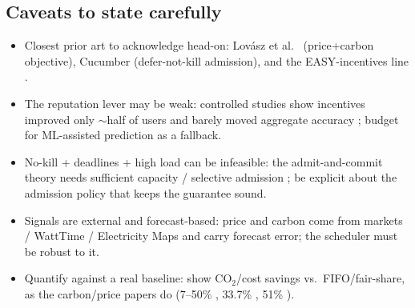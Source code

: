 \documentclass{article}
\begin{document}
\subsection*{Caveats to state carefully}
\begin{itemize}
\item Closest prior art to acknowledge head-on: Lov\'asz et al.\ \cite{r23}
(price+carbon objective), Cucumber \cite{r39} (defer-not-kill admission), and the
EASY-incentives line \cite{r34}.
\item The reputation lever may be weak: controlled studies show incentives improved
only $\sim$half of users and barely moved aggregate accuracy \cite{r32,r33}; budget
for ML-assisted prediction \cite{r31,r35} as a fallback.
\item No-kill + deadlines + high load can be infeasible: the admit-and-commit theory
needs sufficient capacity / selective admission \cite{r40}; be explicit about the
admission policy that keeps the guarantee sound.
\item Signals are external and forecast-based: price and carbon come from markets /
WattTime / Electricity Maps and carry forecast error; the scheduler must be robust to
it.
\item Quantify against a real baseline: show CO$_2$/cost savings vs.\ FIFO/fair-share,
as the carbon/price papers do (7--50\% \cite{r6}, 33.7\% \cite{r12}, 51\% \cite{r13}).
\end{itemize}
\end{document}
